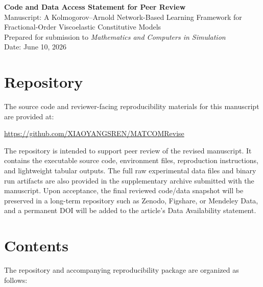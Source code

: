 \documentclass[11pt]{article}
\begin{document}
\begin{center}
{\Large \textbf{Code and Data Access Statement for Peer Review}}\\[0.5em]
{\large Manuscript: A Kolmogorov--Arnold Network-Based Learning Framework for Fractional-Order Viscoelastic Constitutive Models}\\[0.4em]
Prepared for submission to \emph{Mathematics and Computers in Simulation}\\
Date: June 10, 2026
\end{center}

\section*{Repository}

The source code and reviewer-facing reproducibility materials for this manuscript are provided at:

\begin{center}
\url{https://github.com/XIAOYANGSREN/MATCOMRevise}
\end{center}

The repository is intended to support peer review of the revised manuscript. It contains the executable source code, environment files, reproduction instructions, and lightweight tabular outputs. The full raw experimental data files and binary run artifacts are also provided in the supplementary archive submitted with the manuscript. Upon acceptance, the final reviewed code/data snapshot will be preserved in a long-term repository such as Zenodo, Figshare, or Mendeley Data, and a permanent DOI will be added to the article's Data Availability statement.

\section*{Contents}

The repository and accompanying reproducibility package are organized as follows:
\end{document}
